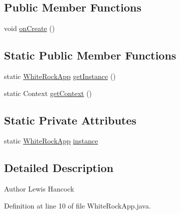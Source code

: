 \subsection*{Public Member Functions}
\begin{DoxyCompactItemize}
\item 
void \hyperlink{classuk_1_1ac_1_1swan_1_1digitaltrails_1_1utils_1_1_white_rock_app_ad27bd8dfd984fdeaa0caa3763a290320}{on\+Create} ()
\end{DoxyCompactItemize}
\subsection*{Static Public Member Functions}
\begin{DoxyCompactItemize}
\item 
static \hyperlink{classuk_1_1ac_1_1swan_1_1digitaltrails_1_1utils_1_1_white_rock_app}{White\+Rock\+App} \hyperlink{classuk_1_1ac_1_1swan_1_1digitaltrails_1_1utils_1_1_white_rock_app_ae787ad1d6d5634b32408a6e013fef3f4}{get\+Instance} ()
\item 
static Context \hyperlink{classuk_1_1ac_1_1swan_1_1digitaltrails_1_1utils_1_1_white_rock_app_a1fb9114242141ed1bf402d8c19770f52}{get\+Context} ()
\end{DoxyCompactItemize}
\subsection*{Static Private Attributes}
\begin{DoxyCompactItemize}
\item 
static \hyperlink{classuk_1_1ac_1_1swan_1_1digitaltrails_1_1utils_1_1_white_rock_app}{White\+Rock\+App} \hyperlink{classuk_1_1ac_1_1swan_1_1digitaltrails_1_1utils_1_1_white_rock_app_a08f9bc460678e90bf984a3de0a975279}{instance}
\end{DoxyCompactItemize}


\subsection{Detailed Description}
\begin{DoxyAuthor}{Author}
Lewis Hancock 
\end{DoxyAuthor}


Definition at line 10 of file White\+Rock\+App.\+java.




